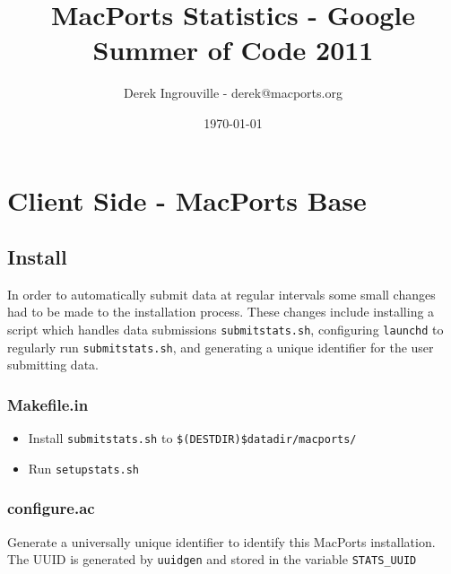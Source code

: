 \documentclass[10pt]{article}
\title{MacPorts Statistics - Google Summer of Code 2011}
\author{ Derek Ingrouville - derek@macports.org }
\date{\today}
\begin{document}
\maketitle

\setlength{\parskip}{0.3cm}

\section{Client Side - MacPorts Base}

\subsection{Install}

In order to automatically submit data at regular intervals some small changes had to be made to the installation process. These changes include installing a script which handles data submissions \texttt{submitstats.sh}, configuring \texttt{launchd} to regularly run \texttt{submitstats.sh}, and generating a unique identifier for the user submitting data.

\subsubsection{Makefile.in}
\begin{itemize}
  \item Install \texttt{submitstats.sh} to \texttt{\$(DESTDIR)\${datadir}/macports/}
  \item Run \texttt{setupstats.sh}
\end{itemize}

\subsubsection{configure.ac}

Generate a universally unique identifier to identify this MacPorts installation. The UUID is generated by \texttt{uuidgen} and stored in the variable \texttt{STATS\_UUID}
\end{document}
